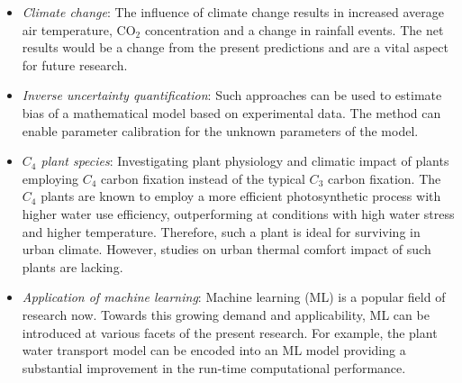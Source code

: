 \begin{itemize}
	\item \textit{Climate change}: The influence of climate change results in increased average air temperature, CO$_2$ concentration and a change in rainfall events. The net results would be a change from the present predictions and are a vital aspect for future research.
	
	\item \textit{Inverse uncertainty quantification}: Such approaches can be used to estimate bias of a mathematical model based on experimental data. The method can enable parameter calibration for the unknown parameters of the model.  
	
	\item \textit{$C_4$ plant species}:	Investigating plant physiology and climatic impact of plants employing $C_4$ carbon fixation instead of the typical $C_3$ carbon fixation. The $C_4$ plants are known to employ a more efficient photosynthetic process with higher water use efficiency, outperforming at conditions with high water stress and higher temperature. Therefore, such a plant is ideal for surviving in urban climate. However, studies on urban thermal comfort impact of such plants are lacking.
	
	\item \textit{Application of machine learning}: Machine learning (ML) is a popular field of research now. Towards this growing demand and applicability, ML can be introduced at various facets of the present research. For example, the plant water transport model can be encoded into an ML model providing a substantial improvement in the run-time computational performance. 
\end{itemize}
